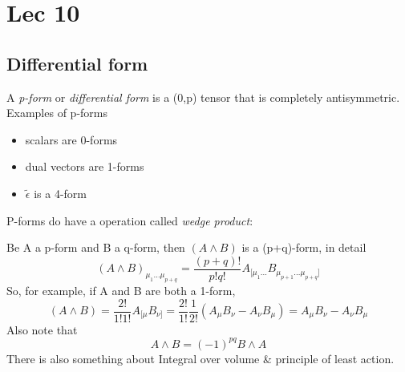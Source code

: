\section{Lec 10}
\subsection{Differential form}
A \emph{p-form} or \emph{differential form} is a (0,p) tensor that is completely antisymmetric.
Examples of p-forms
\begin{itemize}
	\item scalars are 0-forms
	\item dual vectors are 1-forms
	\item $\tilde{\epsilon }$ is a 4-form
\end{itemize}
P-forms do have a operation called \emph{wedge product}:\par
Be A a p-form and B a q-form, then $\left( A \wedge B \right)$ is a (p+q)-form, in detail
\[
	\left( A \wedge B \right)_{\mu _{1}\ldots \mu _{p+q}} = \frac{\left( p+q \right)!}{p!q!} A_{[\mu _{1}\ldots }B_{\mu _{p+1}\ldots \mu _{p+q}]}
\]
So, for example, if A and B are both a 1-form,
\[
	\left( A \wedge B \right) = \frac{2!}{1!1!} A_{[\mu }B_{\nu ]} = \frac{2!}{1!} \frac{1}{2!} \left( A_{\mu }B_{\nu }-A_{\nu }B_{\mu } \right) = A_{\mu }B_{\nu }-A_{\nu }B_{\mu }	
\]
Also note that
\[
A\wedge B = \left( -1 \right)^{pq} B\wedge A	
\]
There is also something about Integral over volume \& principle of least action. 

